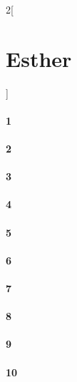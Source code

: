 \documentclass{book}
\begin{document}
\begin{multicols}{2}[\part{Esther}]
\subsection*{1}
\subsection*{2}
\subsection*{3}
\subsection*{4}
\subsection*{5}
\subsection*{6}
\subsection*{7}
\subsection*{8}
\subsection*{9}
\subsection*{10}
\end{multicols}
\end{document}
